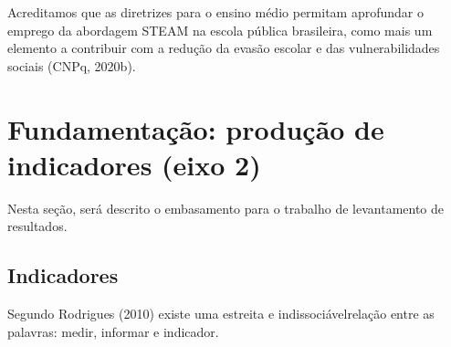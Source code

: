 \documentclass[
12pt,		%
openright,	%
twoside,  %
a4paper,			%
chapter=TITLE,		%
english,			%
french,				%
spanish,			%
brazil				%
]{USPSC-classe/USPSC}
\begin{document}
\noindent\begin{center}\mbox{\centering{}}\end{center}


Acreditamos que as diretrizes para o ensino m\'edio permitam aprofundar o emprego da abordagem STEAM na escola p\'ublica brasileira, como mais um elemento a contribuir com a redu\c{c}\~ao da evas\~ao escolar e das vulnerabilidades sociais  (CNPq, 2020b).

















\section[Fundamenta\c{c}\~ao: produ\c{c}\~ao de indicadores (eixo 2)]{Fundamenta\c{c}\~ao: produ\c{c}\~ao de indicadores (eixo 2)}\label{Fundamenta\c{c}\~ao: produ\c{c}\~ao de indicadores (eixo 2)}
Nesta se\c{c}\~ao, ser\'a descrito o embasamento para o trabalho de levantamento de resultados.

















\subsection[Indicadores]{Indicadores}\label{Indicadores}
Segundo  Rodrigues (2010)  existe uma \textquotedbl estreita e indissoci\'avel\textquotedbl  rela\c{c}\~ao entre as palavras: medir, informar e \textquotedbl indicador\textquotedbl .
\end{document}
